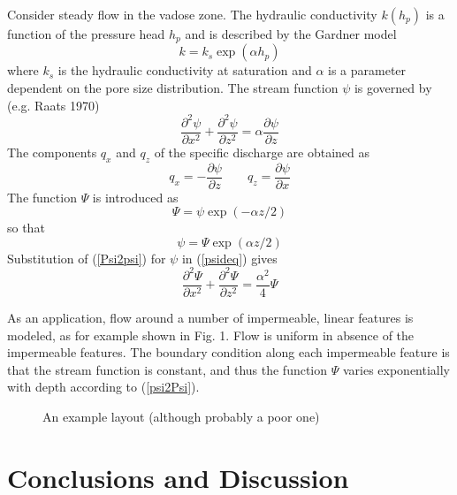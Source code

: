 \documentclass{elsart}
\begin{document}
Consider steady flow in the vadose zone. The hydraulic conductivity $k(h_p)$ is a function of the pressure head $h_p$ and is described by the Gardner model
\begin{equation}
k = k_s \exp(\alpha h_p)
\end{equation}
where $k_s$ is the hydraulic conductivity at saturation and $\alpha$ is a parameter dependent on the pore size distribution. The stream function $\psi$ is governed by (e.g. Raats 1970)
\begin{equation} \label{psideq}
\frac{ \partial^2\psi }{\partial x^2} + \frac{ \partial^2\psi }{\partial z^2}  = \alpha \frac{ \partial\psi }{\partial z} 
\end{equation}
The components $q_x$ and $q_z$ of the specific discharge are obtained as
\begin{equation}
q_x = -\frac{\partial\psi}{\partial z} \qquad q_z = \frac{\partial\psi}{\partial x}
\end{equation}
The function $\Psi$ is introduced as 
\begin{equation}\label{psi2Psi}
\Psi = \psi\exp(-\alpha z/2)
\end{equation} so that  
\begin{equation} \label{Psi2psi}
\psi = \Psi \exp(\alpha z / 2)
\end{equation}
Substitution of (\ref{Psi2psi}) for $\psi$ in (\ref{psideq}) gives
\begin{equation} \label{psideq2}
\frac{ \partial^2\Psi }{\partial x^2} + \frac{ \partial^2\Psi }{\partial z^2}  = \frac{\alpha^2}{4} \Psi
\end{equation}

As an application, flow around a number of impermeable, linear features is modeled, as for example shown in Fig. 1. Flow is uniform in absence of the impermeable features. The boundary condition along each impermeable feature is that the stream function is constant, and thus the function $\Psi$ varies exponentially with depth according to (\ref{psi2Psi}). 

\begin{figure}
\centering
  \caption{An example layout (although probably a poor one)}
  \label{Fig6}
\end{figure} 

\section{Conclusions and Discussion}

%



\end{document}

